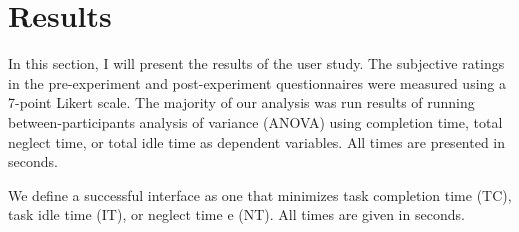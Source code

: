 \section{Results}
\label{sec:study-results}
In this section, I will present the results of the user study. The subjective ratings in the pre-experiment and post-experiment questionnaires were measured using a 7-point Likert scale. The majority of our analysis was run results of running between-participants analysis of variance (ANOVA) using completion time, total neglect time, or total idle time as dependent variables. All times are presented in seconds.


We define a successful interface as one that minimizes task completion time (TC), task idle time (IT), or neglect time e (NT). All times are given in seconds. 